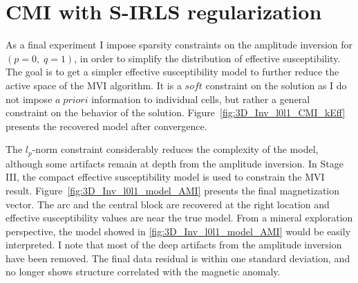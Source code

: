 \newpage
\section{CMI with S-IRLS regularization}
As a final experiment I impose sparsity constraints on the amplitude inversion for $(p = 0,\; q = 1)$, in order to simplify the distribution of effective susceptibility. 
The goal is to get a simpler effective susceptibility model to further reduce the active space of the MVI algorithm. It is a $soft$ constraint on the solution as I do not impose $a\;priori$ information to individual cells, but rather a general constraint on the behavior of the solution. Figure~\ref{fig:3D_Inv_l0l1_CMI_kEff} presents the recovered model after convergence.

 The $l_p$-norm constraint considerably reduces the complexity of the model, although some artifacts remain at depth from the amplitude inversion.
 In Stage III, the compact effective susceptibility model is used to constrain the MVI result.
 Figure~\ref{fig:3D_Inv_l0l1_model_AMI} presents the final magnetization vector.
 The arc and the central block are recovered at the right location and effective susceptibility values are near the true model. 
 From a mineral exploration perspective, the model showed in \ref{fig:3D_Inv_l0l1_model_AMI}  would be easily interpreted.
 I note that most of the deep artifacts from the amplitude inversion have been removed. The final data residual is within one standard deviation, and no longer shows structure correlated with the magnetic anomaly.

